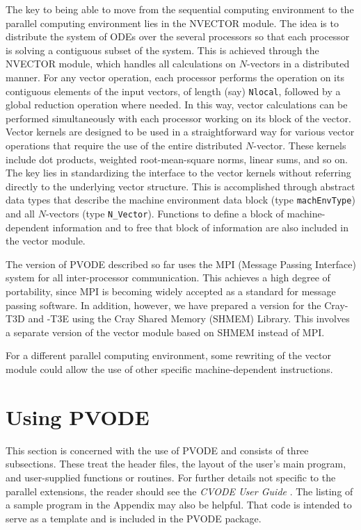The key to being able to move from the sequential computing
environment to the parallel computing environment lies in the NVECTOR
module. The idea is to distribute the system of ODEs over the several
processors so that each processor is solving a contiguous subset of
the system. This is achieved through the NVECTOR module, which handles
all calculations on $N$-vectors in a distributed manner.  For any
vector operation, each processor performs the operation on its
contiguous elements of the input vectors, of length (say) 
{\tt Nlocal}, followed by a global reduction operation where needed.
In this way, vector calculations can be performed simultaneously
with each processor working on its block of the vector.  Vector
kernels are designed to be used in a straightforward way for various
vector operations that require the use of the entire distributed
$N$-vector.  These kernels include dot products, weighted
root-mean-square norms, linear sums, and so on. The key lies in
standardizing the interface to the vector kernels without referring
directly to the underlying vector structure.  This is accomplished
through abstract data types that describe the machine environment data
block (type {\tt machEnvType}) and all $N$-vectors (type {\tt N\_Vector}). 
Functions to define a block of machine-dependent information and to
free that block of information are also included in the vector module.

The version of PVODE described so far uses the MPI (Message Passing
Interface) system \cite{MPI} for all inter-processor
communication. This achieves a high degree of portability, since MPI
is becoming widely accepted as a standard for message passing
software. In addition, however, we have prepared a version for the
Cray-T3D and -T3E using the Cray Shared Memory (SHMEM) Library. This
involves a separate version of the vector module based on SHMEM
instead of MPI.

For a different parallel computing environment, some rewriting of the
vector module could allow the use of other specific machine-dependent
instructions.


\section{Using PVODE}

This section is concerned with the use of PVODE and consists of three
subsections. These treat the header files, the layout of the user's main
program, and user-supplied functions or routines. For further details not
specific to the parallel extensions, the reader should see the {\it CVODE
User Guide }\cite{CVODE_UG}. The listing of a sample program in the
Appendix may also be helpful. That code is intended to serve as a template
and is included in the PVODE package.

